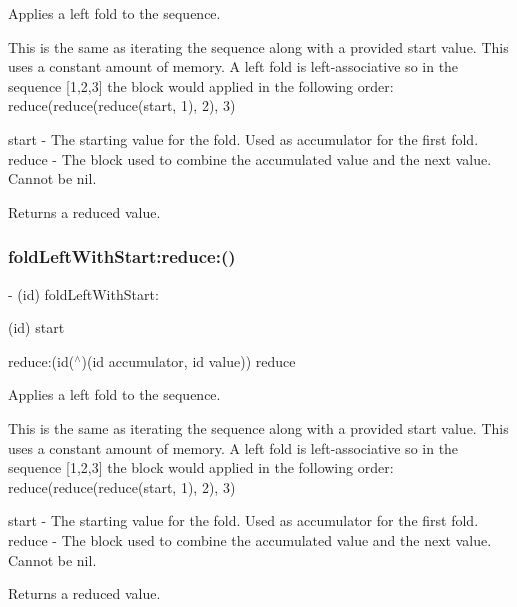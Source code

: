 Applies a left fold to the sequence.

This is the same as iterating the sequence along with a provided start value. This uses a constant amount of memory. A left fold is left-\/associative so in the sequence \mbox{[}1,2,3\mbox{]} the block would applied in the following order\+: reduce(reduce(reduce(start, 1), 2), 3)

start -\/ The starting value for the fold. Used as {\ttfamily accumulator} for the first fold. reduce -\/ The block used to combine the accumulated value and the next value. Cannot be nil.

Returns a reduced value. \mbox{\label{interface_r_a_c_sequence_a75b99901f0b8566a49eaee2099df7738}} 
\subsubsection{\texorpdfstring{fold\+Left\+With\+Start\+:reduce\+:()}{foldLeftWithStart:reduce:()}\hspace{0.1cm}{\footnotesize\ttfamily [2/3]}}
{\footnotesize\ttfamily -\/ (id) fold\+Left\+With\+Start\+: \begin{DoxyParamCaption}\item[{(id)}]{start }\item[{reduce:(id($^\wedge$)(id accumulator, id value))}]{reduce }\end{DoxyParamCaption}}

Applies a left fold to the sequence.

This is the same as iterating the sequence along with a provided start value. This uses a constant amount of memory. A left fold is left-\/associative so in the sequence \mbox{[}1,2,3\mbox{]} the block would applied in the following order\+: reduce(reduce(reduce(start, 1), 2), 3)

start -\/ The starting value for the fold. Used as {\ttfamily accumulator} for the first fold. reduce -\/ The block used to combine the accumulated value and the next value. Cannot be nil.

Returns a reduced value. \mbox{\label{interface_r_a_c_sequence_a75b99901f0b8566a49eaee2099df7738}} 
